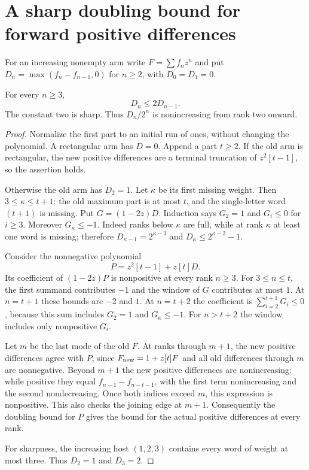 \section{A sharp doubling bound for forward positive differences}
For an increasing nonempty arm write $F=\sum f_nz^n$ and put
$D_n=\max(f_n-f_{n-1},0)$ for $n\ge2$, with $D_0=D_1=0$.
\begin{theorem}
For every $n\ge3$,
\[
                            D_n\le2D_{n-1}.
\]
The constant two is sharp. Thus $D_n/2^n$ is nonincreasing
from rank two onward.
\end{theorem}
\begin{proof}
Normalize the first part to an initial run of ones, without
changing the polynomial. A rectangular arm has $D=0$.
Append a part $t\ge2$. If the old arm is rectangular, the
new positive differences are a terminal truncation of
$z^2[t-1]$, so the assertion holds.

Otherwise the old arm has $D_2=1$. Let $\kappa$ be its first
missing weight. Then $3\le\kappa\le t+1$: the old maximum
part is at most $t$, and the single-letter word $(t+1)$ is
missing. Put $G=(1-2z)D$. Induction says
$G_2=1$ and $G_i\le0$ for $i\ge3$. Moreover $G_\kappa\le-1$.
Indeed ranks below $\kappa$ are full, while at rank $\kappa$
at least one word is missing; therefore
$D_{\kappa-1}=2^{\kappa-3}$ and
$D_\kappa\le2^{\kappa-2}-1$.

Consider the nonnegative polynomial
\[
                         P=z^2[t-1]+z[t]D.
\]
Its coefficient of $(1-2z)P$ is nonpositive at every rank
$n\ge3$. For $3\le n\le t$, the first summand contributes
$-1$ and the window of $G$ contributes at most $1$.
At $n=t+1$ these bounds are $-2$ and $1$.
At $n=t+2$ the coefficient is
$\sum_{i=2}^{t+1}G_i\le0$, because this sum includes
$G_2=1$ and $G_\kappa\le-1$.
For $n>t+2$ the window includes only nonpositive $G_i$.

Let $m$ be the last mode of the old $F$. At ranks through
$m+1$, the new positive differences agree with $P$, since
$F_{\rm new}=1+z[t]F$ and all old differences through $m$
are nonnegative. Beyond $m+1$ the new positive differences
are nonincreasing: while positive they equal
$f_{n-1}-f_{n-t-1}$, with the first term nonincreasing and
the second nondecreasing. Once both indices exceed $m$,
this expression is nonpositive. This also checks the joining
edge at $m+1$. Consequently the doubling bound for $P$
gives the bound for the actual positive differences at every rank.

For sharpness, the increasing host $(1,2,3)$ contains every
word of weight at most three. Thus $D_2=1$ and $D_3=2$.
\end{proof}

